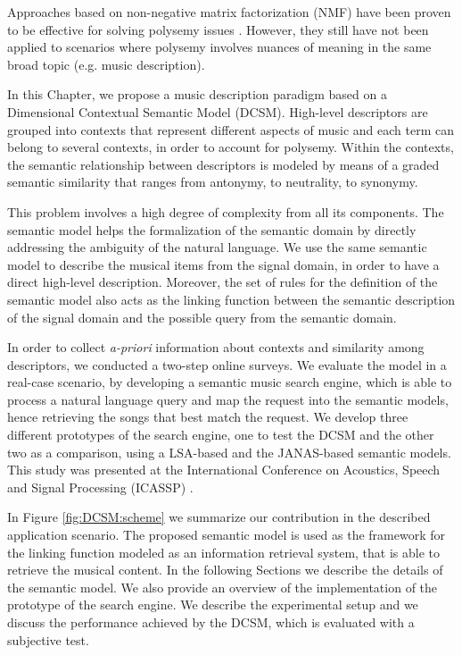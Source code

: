 Approaches based on non-negative matrix factorization (NMF) have been proven to be effective for solving polysemy issues \cite{lee1999}. However, they still have not been applied to scenarios where polysemy involves nuances of meaning in the same broad topic (e.g. music description).

In this Chapter, we propose a music description paradigm based on a Dimensional Contextual Semantic Model (DCSM). High-level descriptors are grouped into contexts that represent different aspects of music and each term can belong to several contexts, in order to account for polysemy. Within the contexts, the semantic relationship between descriptors is modeled by means of a graded semantic similarity that ranges from antonymy, to neutrality, to synonymy. 

This problem involves a high degree of complexity from all its components. The semantic model helps the formalization of the semantic domain by directly addressing the ambiguity of the natural language. We use the same semantic model to describe the musical items from the signal domain, in order to have a direct high-level description. Moreover, the set of rules for the definition of the semantic model also acts as the linking function between the semantic description of the signal domain and the possible query from the semantic domain.

In order to collect \textit{a-priori} information about contexts and similarity among descriptors, we conducted a two-step online surveys. We evaluate the model in a real-case scenario, by developing a semantic music search engine, which is able to process a natural language query and map the request into the semantic models, hence retrieving the songs that best match the request. We develop three different prototypes of the search engine, one to test the DCSM and the other two as a comparison, using a LSA-based and the JANAS-based semantic models. This study was presented at the International Conference on Acoustics, Speech and Signal Processing (ICASSP) \cite{buccoli2015dimensional}.


In Figure \ref{fig:DCSM:scheme} we summarize our contribution in the described application scenario. The proposed semantic model is used as the framework for the linking function modeled as an information retrieval system, that is able to retrieve the musical content.
In the following Sections we describe the details of the semantic model. We also provide an overview of the implementation of the prototype of the search engine. We describe the experimental setup and we discuss the performance achieved by the DCSM, which is evaluated with a subjective test.



